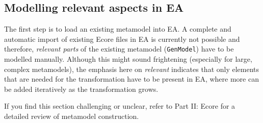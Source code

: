 \subsection{Modelling relevant aspects in EA}
\visHeader

The first step is to load an existing metamodel into EA. A complete and automatic import of existing Ecore files in EA is currently not possible and therefore,
\emph{relevant parts} of the existing metamodel (\texttt{GenModel}) have to be modelled manually. Although this might sound frightening (especially for
large, complex metamodels), the emphasis here on \emph{relevant} indicates that only elements that are needed for the transformation have to be present in
EA, where more can be added iteratively as the transformation grows. 

If you find this section challenging or unclear, refer to Part II: Ecore for a detailed review of metamodel construction.

